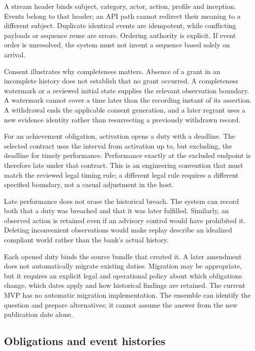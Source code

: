 \documentclass[12pt,a4paper,oneside,openany]{book}
\begin{document}
A stream header binds subject, category, actor, action, profile and inception.
Events belong to that header; an API path cannot redirect their meaning to a
different subject. Duplicate identical events are idempotent, while conflicting
payloads or sequence reuse are errors. Ordering authority is explicit. If event
order is unresolved, the system must not invent a sequence based solely on arrival.

Consent illustrates why completeness matters. Absence of a grant in an incomplete
history does not establish that no grant occurred. A completeness watermark or a
reviewed initial state supplies the relevant observation boundary. A watermark
cannot cover a time later than the recording instant of its assertion. A
withdrawal ends the applicable consent generation, and a later regrant uses a new
evidence identity rather than resurrecting a previously withdrawn record.

For an achievement obligation, activation opens a duty with a deadline. The
selected contract uses the interval from activation up to, but excluding, the
deadline for timely performance. Performance exactly at the excluded endpoint is
therefore late under that contract. This is an engineering convention that must
match the reviewed legal timing rule; a different legal rule requires a different
specified boundary, not a casual adjustment in the host.

Late performance does not erase the historical breach. The system can record both
that a duty was breached and that it was later fulfilled. Similarly, an observed
action is retained even if an advisory control would have prohibited it. Deleting
inconvenient observations would make replay describe an idealized compliant world
rather than the bank's actual history.

Each opened duty binds the source bundle that created it. A later amendment does
not automatically migrate existing duties. Migration may be appropriate, but it
requires an explicit legal and operational policy about which obligations change,
which dates apply and how historical findings are retained. The current MVP has
no automatic migration implementation. The ensemble can identify the question
and prepare alternatives; it cannot assume the answer from the new publication
date alone.

\subsection{Obligations and event histories}
\label{merge:P-03-product:04}
\end{document}
